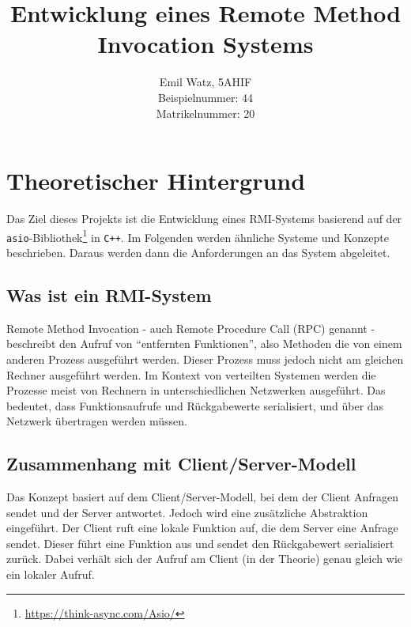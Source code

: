 \documentclass[a4paper,oneside,10pt]{report}
\begin{document}
\pagestyle{empty} 

\title{Entwicklung eines Remote Method Invocation Systems}
\author{Emil Watz, 5AHIF \protect\\Beispielnummer: 44 \protect\\Matrikelnummer: 20}
\maketitle
\tableofcontents 
\cleardoublepage 

\pagestyle{plain} 


\chapter{Theoretischer Hintergrund}

Das Ziel dieses Projekts ist die Entwicklung eines RMI-Systems basierend auf der \texttt{asio}-Bibliothek\footnote{\url{https://think-async.com/Asio/}} in \texttt{C++}. Im Folgenden werden ähnliche Systeme und Konzepte beschrieben. Daraus werden dann die Anforderungen an das System abgeleitet.  

\section{Was ist ein RMI-System}

Remote Method Invocation - auch Remote Procedure Call (RPC) genannt - beschreibt den Aufruf von "`entfernten Funktionen"', also Methoden die von einem anderen Prozess ausgeführt werden. Dieser Prozess muss jedoch nicht am gleichen Rechner ausgeführt werden. Im Kontext von verteilten Systemen werden die Prozesse meist von Rechnern in unterschiedlichen Netzwerken ausgeführt. Das bedeutet, dass Funktionsaufrufe und Rückgabewerte serialisiert, und über das Netzwerk übertragen werden müssen. 


\section{Zusammenhang mit Client/Server-Modell}

Das Konzept basiert auf dem Client/Server-Modell, bei dem der Client Anfragen sendet und der Server antwortet. Jedoch wird eine zusätzliche Abstraktion eingeführt. Der Client ruft eine lokale Funktion auf, die dem Server eine Anfrage sendet. Dieser führt eine Funktion aus und sendet den Rückgabewert serialisiert zurück. Dabei verhält sich der Aufruf am Client (in der Theorie) genau gleich wie ein lokaler Aufruf. 
\end{document}
